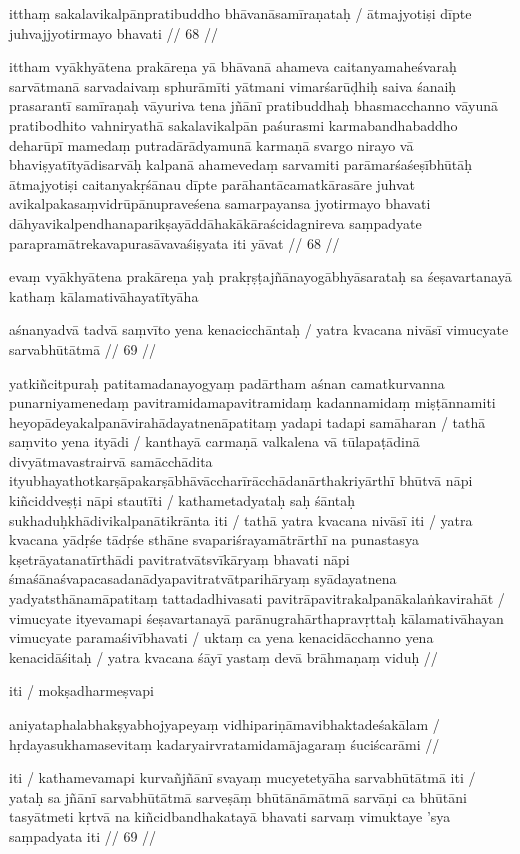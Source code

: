 itthaṃ sakalavikalpānpratibuddho bhāvanāsamīraṇataḥ  /
ātmajyotiṣi dīpte juhvajjyotirmayo bhavati  // 68  //

ittham vyākhyātena prakāreṇa yā bhāvanā ahameva caitanyamaheśvaraḥ sarvātmanā sarvadaivaṃ sphurāmīti yātmani vimarśarūḍhiḥ saiva śanaiḥ prasarantī samīraṇaḥ vāyuriva tena jñānī pratibuddhaḥ bhasmacchanno vāyunā pratibodhito vahniryathā sakalavikalpān paśurasmi karmabandhabaddho deharūpī mamedaṃ putradārādyamunā karmaṇā svargo nirayo vā bhaviṣyatītyādisarvāḥ kalpanā ahamevedaṃ sarvamiti parāmarśaśeṣībhūtāḥ ātmajyotiṣi caitanyakṛśānau dīpte parāhantācamatkārasāre juhvat avikalpakasaṃvidrūpānupraveśena samarpayansa jyotirmayo bhavati dāhyavikalpendhanaparikṣayāddāhakākāraścidagnireva saṃpadyate parapramātrekavapurasāvavaśiṣyata iti yāvat  // 68  //

evaṃ vyākhyātena prakāreṇa yaḥ prakṛṣṭajñānayogābhyāsarataḥ sa śeṣavartanayā kathaṃ kālamativāhayatītyāha

aśnanyadvā tadvā saṃvīto yena kenacicchāntaḥ  /
yatra kvacana nivāsī vimucyate sarvabhūtātmā  // 69  //

yatkiñcitpuraḥ patitamadanayogyaṃ padārtham aśnan camatkurvanna punarniyamenedaṃ pavitramidamapavitramidaṃ kadannamidaṃ miṣṭānnamiti heyopādeyakalpanāvirahādayatnenāpatitaṃ yadapi tadapi samāharan  / tathā saṃvito yena ityādi  / kanthayā carmaṇā valkalena vā tūlapaṭādinā divyātmavastrairvā samācchādita ityubhayathotkarṣāpakarṣābhāvāccharīrācchādanārthakriyārthī bhūtvā nāpi kiñciddveṣṭi nāpi stautīti  / kathametadyataḥ saḥ śāntaḥ sukhaduḥkhādivikalpanātikrānta iti  / tathā yatra kvacana nivāsī iti  / yatra kvacana yādṛśe tādṛśe sthāne svapariśrayamātrārthī na punastasya kṣetrāyatanatīrthādi pavitratvātsvīkāryaṃ bhavati nāpi śmaśānaśvapacasadanādyapavitratvātparihāryaṃ syādayatnena yadyatsthānamāpatitaṃ tattadadhivasati pavitrāpavitrakalpanākalaṅkavirahāt  / vimucyate ityevamapi śeṣavartanayā parānugrahārthapravṛttaḥ kālamativāhayan vimucyate paramaśivībhavati  / uktaṃ ca yena kenacidācchanno yena kenacidāśitaḥ  / yatra kvacana śāyī yastaṃ devā brāhmaṇaṃ viduḥ  //

iti  / mokṣadharmeṣvapi

aniyataphalabhakṣyabhojyapeyaṃ vidhipariṇāmavibhaktadeśakālam  /
hṛdayasukhamasevitaṃ kadaryairvratamidamājagaraṃ śuciścarāmi  //

iti  / kathamevamapi kurvañjñānī svayaṃ mucyetetyāha sarvabhūtātmā iti  / yataḥ sa jñānī sarvabhūtātmā sarveṣāṃ bhūtānāmātmā sarvāṇi ca bhūtāni tasyātmeti kṛtvā na kiñcidbandhakatayā bhavati sarvaṃ vimuktaye 'sya saṃpadyata iti  // 69  //

